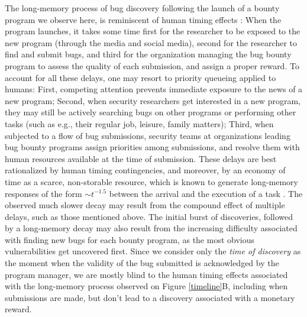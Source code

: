 The long-memory process of bug discovery following the launch of a bounty program we observe here, is reminiscent of human timing effects \cite{maillart2011quantification}: When the program launches, it takes some time first for the researcher to be exposed to the new program (through the media and social media), second for the researcher to find and submit bugs, and third for the organization managing the bug bounty program to assess the quality of each submission, and assign a proper reward. To account for all these delays, one may resort to priority queueing applied to humans: First, competing attention prevents immediate exposure to the news of a new program; Second, when security researchers get interested in a new program, they may still be actively searching bugs on other programs or performing other tasks (such as e.g., their regular job, leisure, family matters); Third, when subjected to a flow of bug submissions, security teams at organizations leading bug bounty programs assign priorities among submissions, and resolve them with human resources available at the time of submission. These delays are best rationalized by human timing contingencies, and moreover, by an economy of time as a scarce, non-storable resource, which is known to generate long-memory responses of the form $\sim t^{-1.5}$ between the arrival and the execution of a task \cite{maillart2011quantification}. The observed much slower decay may result from the compound effect of multiple delays, such as those mentioned above. The initial burst of discoveries, followed by a long-memory decay may also result from the increasing difficulty associated with finding new bugs for each bounty program, as the most obvious vulnerabilities get uncovered first.  Since we consider only the {\it time of discovery} as the moment when the validity of the bug submitted is acknowledged by the program manager, we are mostly blind to the human timing effects associated with the long-memory process observed on Figure \ref{timeline}B, including when submissions are made, but don't lead to a discovery associated with a monetary reward.\\



